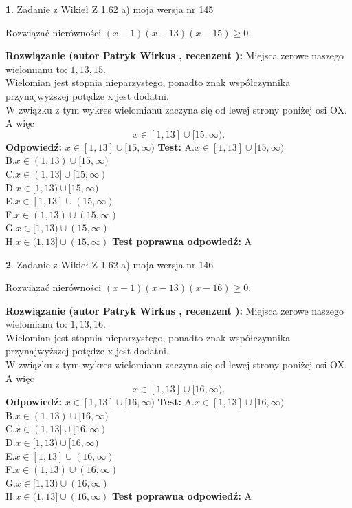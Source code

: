 \documentclass[12pt, a4paper]{article}
\theoremstyle{definition} %
\newtheorem{zad}{}
\newcommand{\zadStart}[1]{\begin{zad}#1\newline}
\newcommand{\zadStop}{\end{zad}}
\newcommand{\rozwStart}[2]{\noindent \textbf{Rozwiązanie (autor #1 , recenzent #2): }\newline}
\newcommand{\rozwStop}{\newline}
\newcommand{\odpStart}{\noindent \textbf{Odpowiedź:}\newline}
\newcommand{\odpStop}{\newline}
\newcommand{\testStart}{\noindent \textbf{Test:}\newline}
\newcommand{\testStop}{\newline}
\newcommand{\kluczStart}{\noindent \textbf{Test poprawna odpowiedź:}\newline}
\newcommand{\kluczStop}{\newline}
\begin{document}
\zadStart{Zadanie z Wikieł Z 1.62 a) moja wersja nr 145}

Rozwiązać nierówności $(x-1)(x-13)(x-15)\ge0$.
\zadStop
\rozwStart{Patryk Wirkus}{}
Miejsca zerowe naszego wielomianu to: $1, 13, 15$.\\
Wielomian jest stopnia nieparzystego, ponadto znak współczynnika przy\linebreak najwyższej potędze x jest dodatni.\\ W związku z tym wykres wielomianu zaczyna się od lewej strony poniżej osi OX. A więc $$x \in [1,13] \cup [15,\infty).$$
\rozwStop
\odpStart
$x \in [1,13] \cup [15,\infty)$
\odpStop
\testStart
A.$x \in [1,13] \cup [15,\infty)$\\
B.$x \in (1,13) \cup [15,\infty)$\\
C.$x \in (1,13] \cup [15,\infty)$\\
D.$x \in [1,13) \cup [15,\infty)$\\
E.$x \in [1,13] \cup (15,\infty)$\\
F.$x \in (1,13) \cup (15,\infty)$\\
G.$x \in [1,13) \cup (15,\infty)$\\
H.$x \in (1,13] \cup (15,\infty)$
\testStop
\kluczStart
A
\kluczStop



\zadStart{Zadanie z Wikieł Z 1.62 a) moja wersja nr 146}

Rozwiązać nierówności $(x-1)(x-13)(x-16)\ge0$.
\zadStop
\rozwStart{Patryk Wirkus}{}
Miejsca zerowe naszego wielomianu to: $1, 13, 16$.\\
Wielomian jest stopnia nieparzystego, ponadto znak współczynnika przy\linebreak najwyższej potędze x jest dodatni.\\ W związku z tym wykres wielomianu zaczyna się od lewej strony poniżej osi OX. A więc $$x \in [1,13] \cup [16,\infty).$$
\rozwStop
\odpStart
$x \in [1,13] \cup [16,\infty)$
\odpStop
\testStart
A.$x \in [1,13] \cup [16,\infty)$\\
B.$x \in (1,13) \cup [16,\infty)$\\
C.$x \in (1,13] \cup [16,\infty)$\\
D.$x \in [1,13) \cup [16,\infty)$\\
E.$x \in [1,13] \cup (16,\infty)$\\
F.$x \in (1,13) \cup (16,\infty)$\\
G.$x \in [1,13) \cup (16,\infty)$\\
H.$x \in (1,13] \cup (16,\infty)$
\testStop
\kluczStart
A
\kluczStop
\end{document}
